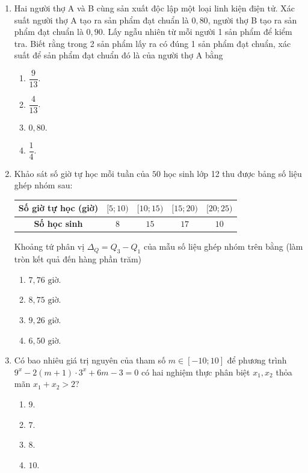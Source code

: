 \documentclass[12pt,a4paper]{article}
\begin{document}
\begin{enumerate}[label=\textbf{Câu \arabic*:}, leftmargin=*]
\item Hai người thợ A và B cùng sản xuất độc lập một loại linh kiện điện tử. Xác suất người thợ A tạo ra sản phẩm đạt chuẩn là $0{,}80$, người thợ B tạo ra sản phẩm đạt chuẩn là $0{,}90$. Lấy ngẫu nhiên từ mỗi người 1 sản phẩm để kiểm tra. Biết rằng trong 2 sản phẩm lấy ra có đúng 1 sản phẩm đạt chuẩn, xác suất để sản phẩm đạt chuẩn đó là của người thợ A bằng
\begin{enumerate}[label=\Alph*.]
    \item $\dfrac{9}{13}$.
    \item $\dfrac{4}{13}$.
    \item $0{,}80$.
    \item $\dfrac{1}{4}$.
\end{enumerate}

\item Khảo sát số giờ tự học mỗi tuần của $50$ học sinh lớp 12 thu được bảng số liệu ghép nhóm sau:
\begin{center}
\begin{tabular}{|c|c|c|c|c|}
\hline
\textbf{Số giờ tự học (giờ)} & $[5; 10)$ & $[10; 15)$ & $[15; 20)$ & $[20; 25)$ \\ \hline
\textbf{Số học sinh} & $8$ & $15$ & $17$ & $10$ \\ \hline
\end{tabular}
\end{center}
Khoảng tứ phân vị $\Delta_Q = Q_3 - Q_1$ của mẫu số liệu ghép nhóm trên bằng (làm tròn kết quả đến hàng phần trăm)
\begin{enumerate}[label=\Alph*.]
    \item $7{,}76\text{ giờ}$.
    \item $8{,}75\text{ giờ}$.
    \item $9{,}26\text{ giờ}$.
    \item $6{,}50\text{ giờ}$.
\end{enumerate}

\item Có bao nhiêu giá trị nguyên của tham số $m \in [-10; 10]$ để phương trình $9^x - 2(m+1) \cdot 3^x + 6m - 3 = 0$ có hai nghiệm thực phân biệt $x_1, x_2$ thỏa mãn $x_1 + x_2 > 2$?
\begin{enumerate}[label=\Alph*.]
    \item $9$.
    \item $7$.
    \item $8$.
    \item $10$.
\end{enumerate}


\end{enumerate}
\end{document}
